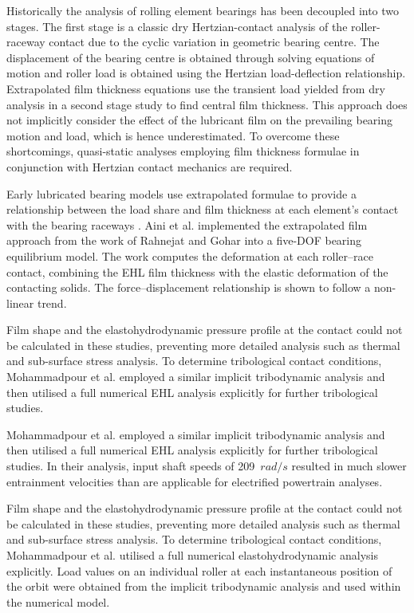 Historically the analysis of rolling element bearings has been decoupled into two stages. The first stage is a classic dry Hertzian-contact analysis of the roller-raceway contact due to the cyclic variation in geometric bearing centre.  The displacement of the bearing centre is obtained through solving equations of motion and roller load is obtained using the Hertzian load-deflection relationship. Extrapolated film thickness equations use the transient load yielded from dry analysis in a second stage study to find central film thickness. This approach does not implicitly consider the effect of the lubricant film on the prevailing bearing motion and load, which is hence underestimated. To overcome these shortcomings, quasi-static analyses employing film thickness formulae in conjunction with Hertzian contact mechanics are required.

Early lubricated bearing models use extrapolated formulae to provide a relationship between the load share and film thickness at each element’s contact with the bearing raceways \cite{Rahnejat1985}. Aini et al. \cite{Aini2002} implemented the extrapolated film approach from the work of Rahnejat and Gohar \cite{Rahnejat1985} into a five-DOF bearing equilibrium model. The work computes the deformation at each roller–race contact, combining the EHL film thickness with the elastic deformation of the contacting solids. The force–displacement relationship is shown to follow a non-linear trend.

Film shape and the elastohydrodynamic pressure profile at the contact could not be calculated in these studies, preventing more detailed analysis such as thermal and sub-surface stress analysis. To determine tribological contact conditions, Mohammadpour et al. \cite{Mohammadpour2015c} employed a similar implicit tribodynamic analysis and then utilised a full numerical EHL analysis explicitly for further tribological studies.

Mohammadpour et al. \cite{Mohammadpour2015c} employed a similar implicit tribodynamic analysis and then utilised a full numerical EHL analysis explicitly for further tribological studies. In their analysis, input shaft speeds of 209~$rad/s$ resulted in much slower entrainment velocities than are applicable for electrified powertrain analyses. 

Film shape and the elastohydrodynamic pressure profile at the contact could not be calculated in these studies, preventing more detailed analysis such as thermal and sub-surface stress analysis. To determine tribological contact conditions, Mohammadpour et al. \cite{Mohammadpour2015c} utilised a full numerical elastohydrodynamic analysis explicitly. Load values on an individual roller at each instantaneous position of the orbit were obtained from the implicit tribodynamic analysis and used within the numerical model.

